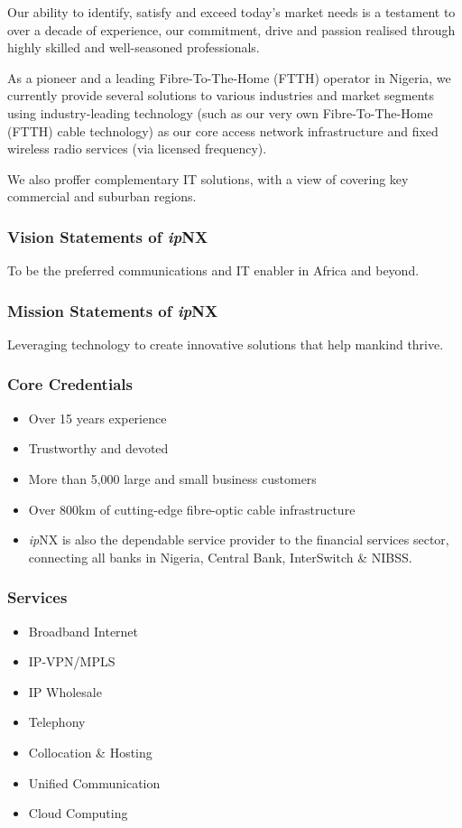 Our ability to identify, satisfy and exceed today’s market needs is a testament to over a decade of experience, our commitment, drive and passion realised through highly skilled and well-seasoned professionals.

As a pioneer and a leading Fibre-To-The-Home (FTTH) operator in Nigeria, we currently provide several solutions to various industries and market segments using industry-leading technology (such as our very own Fibre-To-The-Home (FTTH) cable technology) as our core access network infrastructure and fixed wireless radio services (via licensed frequency).

We also proffer complementary IT solutions, with a view of covering key commercial and suburban regions.
\subsubsection{Vision Statements of \textit{ip}NX}
To be the preferred communications and IT enabler in Africa and beyond.
\subsubsection{Mission Statements of \textit{ip}NX}
Leveraging technology to create innovative solutions that help mankind thrive.
\subsubsection{Core Credentials}
\begin{itemize}
	\item[] Over 15 years experience
	\item[] Trustworthy and devoted
	\item[] More than 5,000 large and small business customers
	\item[] Over 800km of cutting-edge fibre-optic cable infrastructure
	\item[] \textit{ip}NX is also the dependable service provider to the financial services sector, connecting all banks in Nigeria, Central Bank, InterSwitch \& NIBSS.
\end{itemize}
\subsubsection{Services}
\begin{itemize}
	\item[] Broadband Internet
	\item[] IP-VPN/MPLS
	\item[] IP Wholesale
	\item[] Telephony
	\item[] Collocation \& Hosting
	\item[] Unified Communication
	\item[] Cloud Computing
\end{itemize}
